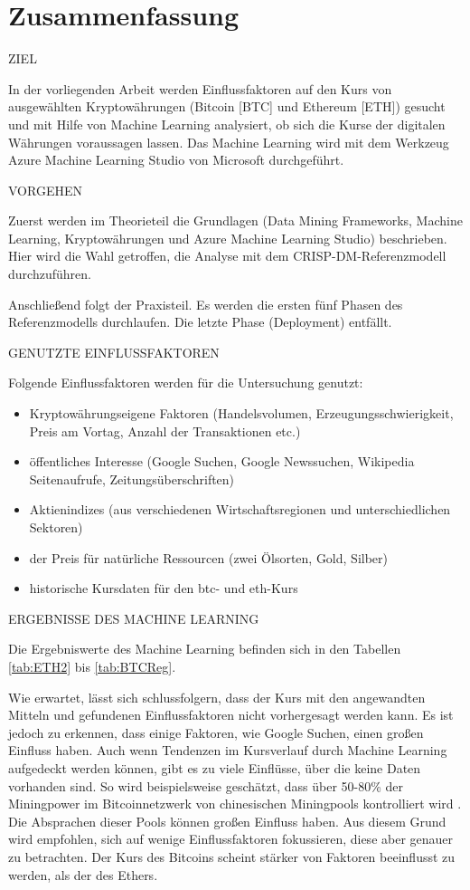 \chapter*{Zusammenfassung}

{\normalsize ZIEL} \par
In der vorliegenden Arbeit werden Einflussfaktoren auf den Kurs von ausgewählten Kryptowährungen (Bitcoin [BTC] und Ethereum [ETH]) gesucht und mit Hilfe von Machine Learning analysiert, ob sich die Kurse der digitalen Währungen voraussagen lassen. Das Machine Learning wird mit dem Werkzeug Azure Machine Learning Studio von Microsoft durchgeführt.

{\normalsize VORGEHEN} \par
Zuerst werden im Theorieteil die Grundlagen (Data Mining Frameworks, Machine Learning, Kryptowährungen und Azure Machine Learning Studio) beschrieben. Hier wird die Wahl getroffen, die Analyse mit dem CRISP-DM-Referenzmodell durchzuführen.\par
Anschließend folgt der Praxisteil. Es werden die ersten fünf Phasen des Referenzmodells durchlaufen. Die letzte Phase (Deployment) entfällt.

{\normalsize GENUTZTE EINFLUSSFAKTOREN} \par
Folgende Einflussfaktoren werden für die Untersuchung genutzt:
\begin{itemize}
\item Kryptowährungseigene Faktoren (Handelsvolumen, Erzeugungsschwierigkeit, Preis am Vortag, Anzahl der Transaktionen etc.)
\item öffentliches Interesse (Google Suchen, Google Newssuchen, Wikipedia Seitenaufrufe, Zeitungsüberschriften)
\item Aktienindizes (aus verschiedenen Wirtschaftsregionen und unterschiedlichen Sektoren)
\item der Preis für natürliche Ressourcen (zwei Ölsorten, Gold, Silber)
\item historische Kursdaten für den \gls{btc}- und \gls{eth}-Kurs
\end{itemize}

{\normalsize ERGEBNISSE DES MACHINE LEARNING} \par
Die Ergebniswerte des Machine Learning befinden sich in den Tabellen \ref{tab:ETH2} bis \ref{tab:BTCReg}.\par
Wie erwartet, lässt sich schlussfolgern, dass der Kurs mit den angewandten Mitteln und gefundenen Einflussfaktoren nicht vorhergesagt werden kann. Es ist jedoch zu erkennen, dass einige Faktoren, wie Google Suchen, einen großen Einfluss haben. Auch wenn Tendenzen im Kursverlauf durch Machine Learning aufgedeckt werden können, gibt es zu viele Einflüsse, über die keine Daten vorhanden sind. So wird beispielsweise geschätzt, dass über 50-80\% der Miningpower im Bitcoinnetzwerk von chinesischen Miningpools kontrolliert wird . Die Absprachen dieser Pools können großen Einfluss haben. Aus diesem Grund wird empfohlen, sich auf wenige Einflussfaktoren fokussieren, diese aber genauer zu betrachten. 
Der Kurs des Bitcoins scheint stärker von Faktoren beeinflusst zu werden, als der des Ethers.

